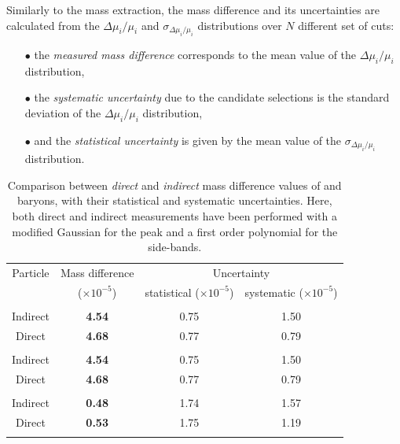 Similarly to the mass extraction, the mass difference and its uncertainties are calculated from the $\Delta \mu_{i}/  \mu_{i}$ and $\sigma_{\Delta \mu_{i} /\mu_{i} }$ distributions over $N$ different set of cuts:
\begin{itemize}
\item[$\bullet$] the \textit{measured mass difference} corresponds to the mean value of the $\Delta \mu_{i}/  \mu_{i}$ distribution,
\item[$\bullet$] the \textit{systematic uncertainty} due to the candidate selections is the standard deviation of the $\Delta \mu_{i}/  \mu_{i}$ distribution,
\item[$\bullet$] and the \textit{statistical uncertainty} is given by the mean value of the $\sigma_{\Delta \mu_{i} /\mu_{i} }$ distribution.
\end{itemize}

\begin{table}[t]
    \centering
    \begin{tabular}{cccc}
    \noalign{\smallskip}\hline \noalign{\smallskip}
    Particle & Mass difference & \multicolumn{2}{c}{Uncertainty}\\  
    & ($\times 10^{-5}$) & statistical ($\times 10^{-5}$) & systematic ($\times 10^{-5}$) \\
    \noalign{\smallskip}\hline \noalign{\smallskip}
    \multicolumn{4}{l}{\bf \rmLambda} \\
    Indirect & \bf 4.54 &  0.75 & 1.50 \\
    Direct & \bf 4.68 & 0.77 & 0.79 \\ 
    \noalign{\smallskip}\hline \noalign{\smallskip}
    \multicolumn{4}{l}{\bf \rmXi} \\
    Indirect & \bf 4.54 &  0.75 & 1.50 \\
    Direct & \bf 4.68 & 0.77 & 0.79 \\ 
    \noalign{\smallskip}\hline \noalign{\smallskip}
    \multicolumn{4}{l}{\bf \rmOmega} \\
    Indirect & \bf 0.48 & 1.74 & 1.57  \\
    Direct & \bf 0.53 & 1.75 & 1.19   \\
    \noalign{\smallskip}\hline \noalign{\smallskip}
    \end{tabular}
    \caption{Comparison between \textit{direct} and \textit{indirect} mass difference values of \rmXi and \rmOmega baryons, with their statistical and systematic uncertainties. Here, both direct and indirect measurements have been performed with a modified Gaussian for the peak and a first order polynomial for the side-bands.}\label{tab:SystMassDifference}
\end{table}

